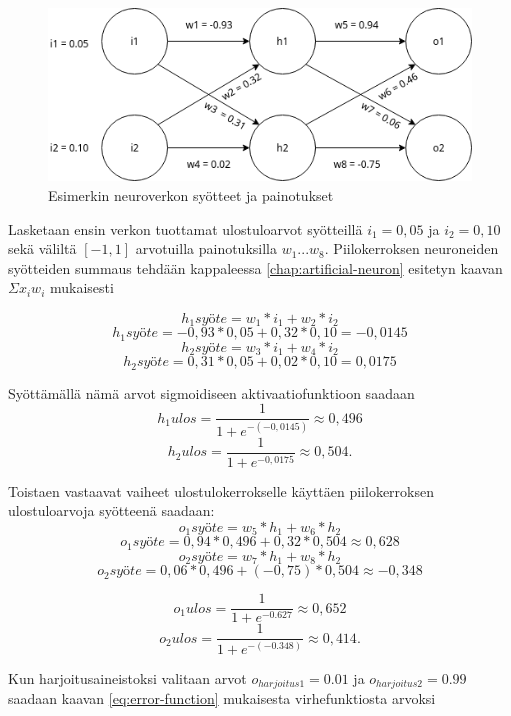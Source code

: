 \documentclass[finnish]{tktltiki2}
\theoremstyle{definition}
\theoremstyle{remark}
\begin{document}
    \begin{figure}[h]
    \centering
    \includegraphics[scale=0.6]{draw-io-backprop-example}
    \caption{Esimerkin neuroverkon syötteet ja painotukset}
    \label{pic:backprop-example}
    \end{figure}

  Lasketaan ensin verkon tuottamat ulostuloarvot syötteillä $i_1 = 0,05$ ja $i_2 = 0,10$ sekä väliltä $[-1, 1]$ arvotuilla painotuksilla $w_1...w_8$. Piilokerroksen neuroneiden syötteiden summaus tehdään kappaleessa \ref{chap:artificial-neuron} esitetyn kaavan $\Sigma x_i w_i$ mukaisesti
  
  $$h_{1}syöte = w_1 * i_1 + w_2 * i_2$$
  $$h_{1}syöte = -0,93 * 0,05 + 0,32 * 0,10 = -0,0145$$
  $$h_{2}syöte = w_3 * i_1 + w_4 * i_2$$
  $$h_{2}syöte = 0,31 * 0,05 + 0,02 * 0,10 = 0,0175$$

  Syöttämällä nämä arvot sigmoidiseen aktivaatiofunktioon saadaan
  $$h_{1}ulos = \frac{1}{1 + e^{-(-0,0145)}} \approx 0,496$$
  $$h_{2}ulos = \frac{1}{1 + e^{-0,0175}} \approx 0,504.$$

  Toistaen vastaavat vaiheet ulostulokerrokselle käyttäen piilokerroksen ulostuloarvoja syötteenä saadaan:
  $$o_{1}syöte = w_5 * h_1 + w_6 * h_2$$
  $$o_{1}syöte = 0,94 * 0,496 + 0,32 * 0,504 \approx 0,628$$
  $$o_{2}syöte = w_7 * h_1 + w_8 * h_2$$
  $$o_{2}syöte = 0,06 * 0,496 + (-0,75) * 0,504 \approx -0,348$$

  $$o_{1}ulos = \frac{1}{1 + e^{-0.627}} \approx 0,652$$
  $$o_{2}ulos = \frac{1}{1 + e^{-(-0.348)}} \approx 0,414.$$

  Kun harjoitusaineistoksi valitaan arvot $o_{harjoitus1} = 0.01$ ja $o_{harjoitus2} = 0.99$ saadaan kaavan \ref{eq:error-function} mukaisesta virhefunktiosta arvoksi
\end{document}
